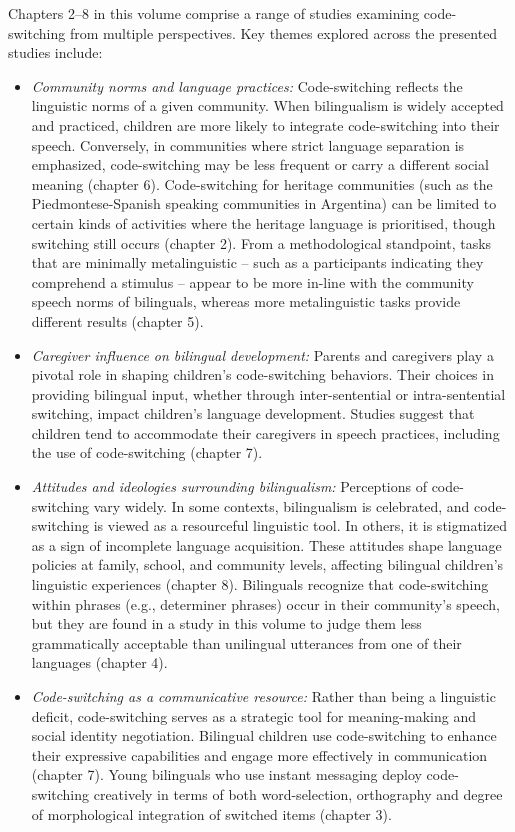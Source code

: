 \documentclass[output=paper]{langscibook}
\begin{document}
Chapters 2--8 in this volume comprise a range of studies examining code-switching from multiple perspectives. Key themes explored across the presented studies include:

\begin{itemize}
\item \emph{Community norms and language practices:} Code-switching reflects the linguistic norms of a given community. When bilingualism is widely accepted and practiced, children are more likely to integrate code-switching into their speech. Conversely, in communities where strict language separation is emphasized, code-switching may be less frequent or carry a different social meaning (chapter 6). Code-switching for heritage communities (such as the Piedmontese-Spanish speaking communities in Argentina) can be limited to certain kinds of activities where the heritage language is prioritised, though switching still occurs (chapter 2). From a methodological standpoint, tasks that are minimally metalinguistic -- such as a participants indicating they comprehend a stimulus -- appear to be more in-line with the community speech norms of bilinguals, whereas more metalinguistic tasks provide different results (chapter 5).
\item \emph{Caregiver influence on bilingual development:} Parents and caregivers play a pivotal role in shaping children's code-switching behaviors. Their choices in providing bilingual input, whether through inter-sentential or intra-sentential switching, impact children's language development. Studies suggest that children tend to accommodate their caregivers in speech practices, including the use of code-switching (chapter 7).
\item \emph{Attitudes and ideologies surrounding bilingualism:} Perceptions of code-switching vary widely. In some contexts, bilingualism is celebrated, and code-switching is viewed as a resourceful linguistic tool. In others, it is stigmatized as a sign of incomplete language acquisition. These attitudes shape language policies at family, school, and community levels, affecting bilingual children's linguistic experiences (chapter 8). Bilinguals recognize that code-switching within phrases (e.g., determiner phrases) occur in their community’s speech, but they are found in a study in this volume to judge them less grammatically acceptable than unilingual utterances from one of their languages (chapter 4).
\item \emph{Code-switching as a communicative resource:} Rather than being a linguistic deficit, code-switching serves as a strategic tool for meaning-making and social identity negotiation. Bilingual children use code-switching to enhance their expressive capabilities and engage more effectively in communication (chapter 7). Young bilinguals who use instant messaging deploy code-switching creatively in terms of both word-selection, orthography and degree of morphological integration of switched items (chapter 3).

\end{itemize}
\end{document}
